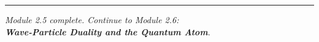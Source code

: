 \documentclass[12pt, a4paper]{book}
\begin{document}
\vspace{2em}
\noindent\textcolor{JourneyColor!40}{\rule{\textwidth}{0.6pt}}
\begin{center}
\textit{\sffamily\small
Module 2.5 complete. Continue to Module 2.6:\\
\textbf{Wave-Particle Duality and the Quantum Atom}.}
\end{center}
\end{document}
